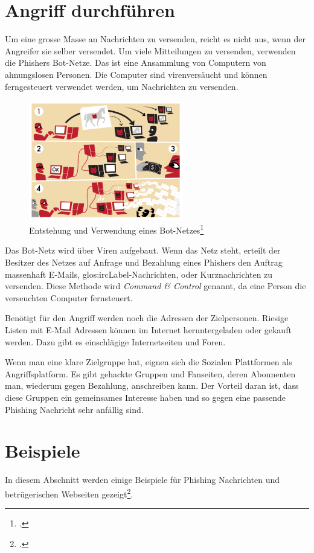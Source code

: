 \section{Angriff durchführen}
Um eine grosse Masse an Nachrichten zu versenden, reicht es nicht aus, wenn der Angreifer sie selber versendet. Um viele Mitteilungen zu versenden, verwenden die Phishers Bot-Netze. Das ist eine Ansammlung von Computern von ahnungslosen Personen. Die Computer sind virenversäucht und können ferngesteuert verwendet werden, um Nachrichten zu versenden.
\begin{figure}[H]
  \centering
  \includegraphics[width=0.6\textwidth]{images/botnet.png}
  \caption{Entstehung und Verwendung eines Bot-Netzes\footcite{Botnet__Wikipedia_2015-05-22}}
  \label{fig:phishing:angriffdurchfueren:botnetz}
\end{figure}
Das Bot-Netz wird über Viren aufgebaut. Wenn das Netz steht, erteilt der Besitzer des Netzes auf Anfrage und Bezahlung eines Phishers den Auftrag massenhaft E-Mails, \Gls{glos:ircLabel}-Nachrichten, oder Kurznachrichten zu versenden. Diese Methode wird \textit{Command \& Control} genannt, da eine Person die verseuchten Computer fernsteuert.

Benötigt für den Angriff werden noch die Adressen der Zielpersonen. Riesige Listen mit E-Mail Adressen können im Internet heruntergeladen oder gekauft werden. Dazu gibt es einschlägige Internetseiten und Foren. 

Wenn man eine klare Zielgruppe hat, eignen sich die Sozialen Plattformen als Angriffsplatform. Es gibt gehackte Gruppen und Fanseiten, deren Abonnenten man, wiederum gegen Bezahlung, anschreiben kann. Der Vorteil daran ist, dass diese Gruppen ein gemeinsames Interesse haben und so gegen eine passende Phishing Nachricht sehr anfällig sind.

\section{Beispiele}
In diesem Abschnitt werden einige Beispiele für Phishing Nachrichten und betrügerischen Webseiten gezeigt\footcite{Was_sind_Phishing_emails_2015-05-22}.

